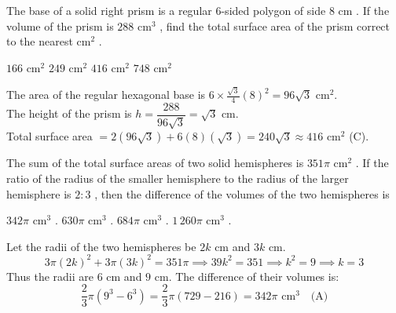 
\question The base of a solid right prism is a regular $6$-sided polygon of side $8\text{ cm}$ . If the volume of the prism is $288\text{ cm}^3$ , find the total surface area of the prism correct to the nearest $\text{cm}^2$ .
\begin{choices}
    \choice $166\text{ cm}^2$
    \choice $249\text{ cm}^2$
    \correctchoice $416\text{ cm}^2$
    \choice $748\text{ cm}^2$
\end{choices}
\begin{solution}
The area of the regular hexagonal base is $6 \times \frac{\sqrt{3}}{4}(8)^2 = 96\sqrt{3}\text{ cm}^2$. \\
The height of the prism is $h = \dfrac{288}{96\sqrt{3}} = \sqrt{3}\text{ cm}$. \\
Total surface area $= 2(96\sqrt{3}) + 6(8)(\sqrt{3}) = 240\sqrt{3} \approx 416\text{ cm}^2$ (C).
\end{solution}

\question The sum of the total surface areas of two solid hemispheres is $351\pi\text{ cm}^2$ . If the ratio of the radius of the smaller hemisphere to the radius of the larger hemisphere is $2 : 3$ , then the difference of the volumes of the two hemispheres is
\begin{choices}
    \correctchoice $342\pi\text{ cm}^3$ .
    \choice $630\pi\text{ cm}^3$ .
    \choice $684\pi\text{ cm}^3$ .
    \choice $1\,260\pi\text{ cm}^3$ .
\end{choices}
\begin{solution}
Let the radii of the two hemispheres be $2k\text{ cm}$ and $3k\text{ cm}$.
\[ 3\pi(2k)^2 + 3\pi(3k)^2 = 351\pi \implies 39k^2 = 351 \implies k^2 = 9 \implies k = 3 \]
Thus the radii are $6\text{ cm}$ and $9\text{ cm}$. The difference of their volumes is:
\[ \frac{2}{3}\pi(9^3 - 6^3) = \frac{2}{3}\pi(729 - 216) = 342\pi\text{ cm}^3 \quad \text{(A)} \]
\end{solution}

